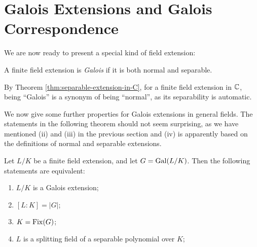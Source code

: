 \section{Galois Extensions and Galois Correspondence}



We are now ready to present a special kind of field extension:

\begin{definition}
    A finite field extension is \textit{Galois} if it is both normal and separable. 
\end{definition}

By Theorem \ref{thm:separable-extension-in-C}, for a finite field extension in $\mathbb C$, being ``Galois'' is a synonym of being ``normal'', as its separability is automatic. 

We now give some further properties for Galois extensions in general fields. The statements in the following theorem should not seem surprising, as we have mentioned (ii) and (iii) in the previous section and (iv) is apparently based on the definitions of normal and separable extensions. 


\begin{theorem} \label{thm:fixed}
	Let $L/K$ be a finite field extension, and let $G = \operatorname{Gal}(L/K)$. Then the following statements are equivalent:
	\begin{enumerate}[label=(\roman*)]
		\item $L/K$ is a Galois extension;
		\item $[L:K] = |G|$;
		\item $K = \operatorname{Fix}(G)$;
		\item $L$ is a splitting field of a separable polynomial over $K$;
	\end{enumerate}
\end{theorem}


